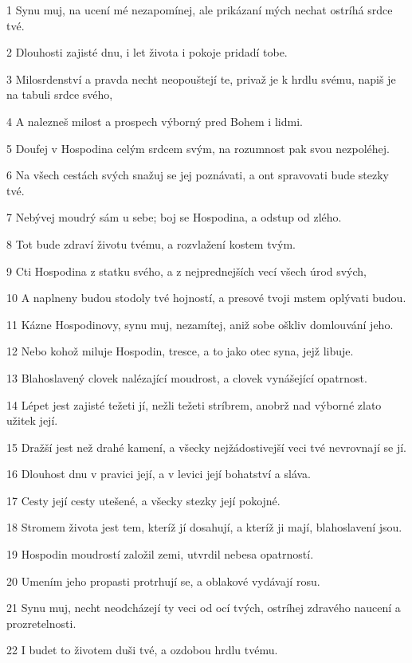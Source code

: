 \par 1 Synu muj, na ucení mé nezapomínej, ale prikázaní mých nechat ostríhá srdce tvé.
\par 2 Dlouhosti zajisté dnu, i let života i pokoje pridadí tobe.
\par 3 Milosrdenství a pravda necht neopouštejí te, privaž je k hrdlu svému, napiš je na tabuli srdce svého,
\par 4 A nalezneš milost a prospech výborný pred Bohem i lidmi.
\par 5 Doufej v Hospodina celým srdcem svým, na rozumnost pak svou nezpoléhej.
\par 6 Na všech cestách svých snažuj se jej poznávati, a ont spravovati bude stezky tvé.
\par 7 Nebývej moudrý sám u sebe; boj se Hospodina, a odstup od zlého.
\par 8 Tot bude zdraví životu tvému, a rozvlažení kostem tvým.
\par 9 Cti Hospodina z statku svého, a z nejprednejších vecí všech úrod svých,
\par 10 A naplneny budou stodoly tvé hojností, a presové tvoji mstem oplývati budou.
\par 11 Kázne Hospodinovy, synu muj, nezamítej, aniž sobe oškliv domlouvání jeho.
\par 12 Nebo kohož miluje Hospodin, tresce, a to jako otec syna, jejž libuje.
\par 13 Blahoslavený clovek nalézající moudrost, a clovek vynášející opatrnost.
\par 14 Lépet jest zajisté težeti jí, nežli težeti stríbrem, anobrž nad výborné zlato užitek její.
\par 15 Dražší jest než drahé kamení, a všecky nejžádostivejší veci tvé nevrovnají se jí.
\par 16 Dlouhost dnu v pravici její, a v levici její bohatství a sláva.
\par 17 Cesty její cesty utešené, a všecky stezky její pokojné.
\par 18 Stromem života jest tem, kteríž jí dosahují, a kteríž ji mají, blahoslavení jsou.
\par 19 Hospodin moudrostí založil zemi, utvrdil nebesa opatrností.
\par 20 Umením jeho propasti protrhují se, a oblakové vydávají rosu.
\par 21 Synu muj, necht neodcházejí ty veci od ocí tvých, ostríhej zdravého naucení a prozretelnosti.
\par 22 I budet to životem duši tvé, a ozdobou hrdlu tvému.
